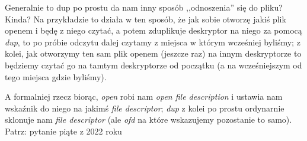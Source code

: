 Generalnie to dup po prostu da nam inny sposób ,,odnoszenia'' się do pliku? Kinda? Na przykładzie to działa w ten sposób, że jak sobie otworzę jakiś plik openem i będę z niego czytać, a potem zduplikuje deskryptor na niego za pomocą \textit{dup}, to po próbie odczytu dalej czytamy z miejsca w którym wcześniej byliśmy; z kolei, jak otworzymy ten sam plik openem (jeszcze raz) na innym deskryptorze to będziemy czytać go na tamtym deskryptorze od początku (a na wcześniejszym od tego miejsca gdzie byliśmy). 

A formalniej rzecz biorąc, \textit{open} robi nam \textit{open file description} i ustawia nam wskaźnik do niego na jakimś \textit{file descriptor}; \textit{dup} z kolei po prostu ordynarnie sklonuje nam \textit{file descriptor} (ale \textit{ofd} na które wskazujemy pozostanie to samo). Patrz: pytanie piąte z 2022 roku